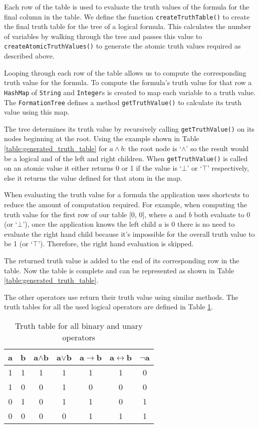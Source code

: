 \documentclass{report}
\begin{document}
Each row of the table is used to evaluate the truth values of the formula for the final column in the table. We define the function {\tt createTruthTable()} to create the final truth table for the tree of a logical formula. This calculates the number of variables by walking through the tree and passes this value to {\tt createAtomicTruthValues()} to generate the atomic truth values required as described above. 

Looping through each row of the table allows us to compute the corresponding truth value for the formula. To compute the formula's truth value for that row a {\tt HashMap} of {\tt String} and {\tt Integer}s is created to map each variable to a truth value. The {\tt FormationTree} defines a method {\tt getTruthValue()} to calculate its truth value using this map.

The tree determines its truth value by recursively calling {\tt getTruthValue()} on its nodes beginning at the root. Using the example shown in Table \ref{table:generated_truth_table} for $a \land b$: the root node is `$\land$' so the result would be a logical and of the left and right children. When {\tt getTruthValue()} is called on an atomic value it either returns 0 or 1 if the value is `$\bot$' or `$\top$' respectively, else it returns the value defined for that atom in the map.

When evaluating the truth value for a formula the application uses shortcuts to reduce the amount of computation required. For example, when computing the truth value for the first row of our table [0, 0], where $a$ and $b$ both evaluate to 0 (or `$\bot$'), once the application knows the left child $a$ is 0 there is no need to evaluate the right hand child because it's impossible for the overall truth value to be 1 (or `$\top$'). Therefore, the right hand evaluation is skipped.

The returned truth value is added to the end of its corresponding row in the table. Now the table is complete and can be represented as shown in Table \ref{table:generated_truth_table}.

The other operators use return their truth value using similar methods. The truth tables for all the used logical operators are defined in Table \ref{table:logical_operators}.

\begin{table}[h]
  \begin{center}
    \begin{tabular}{ | c | c || c | c | c | c | c | }
      \hline
      a & b & a$\land$b & a$\lor$b & a$\to$b & a$\leftrightarrow$b & $\lnot$a \\ \hline
      1 & 1 & 1 & 1 & 1 & 1 & 0 \\
      1 & 0 & 0 & 1 & 0 & 0 & 0 \\
      0 & 1 & 0 & 1 & 1 & 0 & 1 \\
      0 & 0 & 0 & 0 & 1 & 1 & 1 \\
      \hline
    \end{tabular}
  \end{center}
  \caption{Truth table for all binary and unary operators}
  \label{table:logical_operators}
\end{table}
\end{document}
